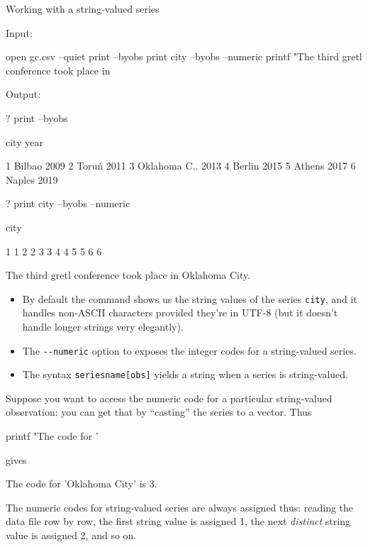 \begin{script}[htbp]
  \caption{Working with a string-valued series}
  \label{listing:cities}
 Input:
\begin{scodebit}
open gc.csv --quiet
print --byobs
print city --byobs --numeric
printf "The third gretl conference took place in %
\end{scodebit}

Output:
\begin{outbit}
? print --byobs

          city         year

1       Bilbao         2009
2        Toruń         2011
3 Oklahoma C..         2013
4       Berlin         2015
5       Athens         2017
6       Naples         2019

? print city --byobs --numeric

          city

1            1
2            2
3            3
4            4
5            5
6            6

The third gretl conference took place in Oklahoma City.
\end{outbit}
\end{script}

\begin{itemize}
\item By default the  command shows us the string values
  of the series \texttt{city}, and it handles non-ASCII characters
  provided they're in UTF-8 (but it doesn't handle longer strings
  very elegantly).
\item The \verb|--numeric| option to  exposes the
  integer codes for a string-valued series.
\item The syntax \texttt{seriesname[obs]} yields a string when a
  series is string-valued.
\end{itemize}

Suppose you want to access the numeric code for a particular
string-valued observation: you can get that by ``casting'' the series
to a vector. Thus
\begin{code}
printf "The code for '%
\end{code}
gives
\begin{code}
The code for 'Oklahoma City' is 3.
\end{code}

The numeric codes for string-valued series are always assigned thus:
reading the data file row by row, the first string value is assigned
1, the next \textit{distinct} string value is assigned 2, and so on.

